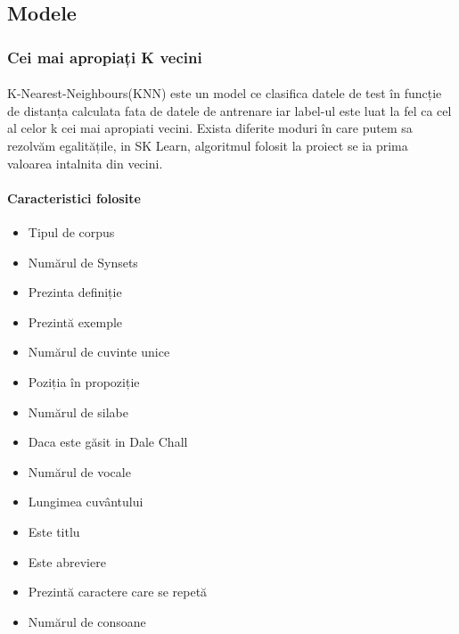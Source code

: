 \documentclass{article}
\begin{document}
 
 
 
\subsection{Modele}
\subsubsection{Cei mai apropiați K vecini}
\paragraph{} K-Nearest-Neighbours(KNN) este un model ce clasifica datele de test în funcție de distanța calculata fata de datele de antrenare iar label-ul este luat la fel ca cel al celor k cei mai apropiati vecini. Exista diferite moduri în care putem sa rezolvăm egalitățile, in SK Learn, algoritmul folosit la proiect se ia prima valoarea intalnita din vecini.
\paragraph{Caracteristici folosite}
\begin{itemize}
  \item Tipul de corpus
  \item Numărul de Synsets
  \item Prezinta definiție
  \item Prezintă exemple
  \item Numărul de cuvinte unice
  \item Poziția în propoziție
  \item Numărul de silabe
  \item Daca este găsit in Dale Chall
  \item Numărul de vocale
  \item Lungimea cuvântului
  \item Este titlu
  \item Este abreviere
  \item Prezintă caractere care se repetă
  \item Numărul de consoane
\end{itemize}
\end{document}
